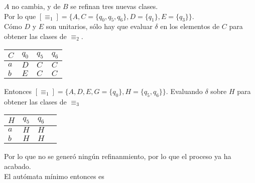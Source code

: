 \documentclass{article}
\begin{document}
\begin{enumerate}
{\begin{enumerate}
                $A$ no cambia, y de $B$ se refinan tres nuevas clases.\\
                Por lo que $[\equiv_{1}] = \{A, C = \{q_{0}, q_{5}, q_{6}\},
                D = \{q_{1}\}, E = \{q_{3}\}\}$.\\
                Cómo $D$ y $E$ son unitarios, sólo hay que evaluar $\delta$ en 
                los elementos de $C$ para obtener las clases de $\equiv_{2}$.\\
                \begin{table}[H]
                    \centering
                    \begin{tabular}{|l|l|l|l|}
                    \hline
                    $C$ & $q_{0}$ & $q_{5}$ & $q_{6}$ \\ \hline
                    $a$ & $D$     & $C$     & $C$     \\ \hline
                    $b$ & $E$     & $C$     & $C$     \\ \hline
                    \end{tabular}
                \end{table} 
                Entonces $[\equiv_{1}] = \{A, D, E, G = \{q_{0}\}, H = \{q_{5},
                q_{6}\}\}$.
                Evaluando $\delta$ sobre $H$ para obtener las clases de 
                $\equiv_{3}$
                \begin{table}[H]
                    \centering
                    \begin{tabular}{|l|l|l|l|}
                    \hline
                    $H$ & $q_{5}$ & $q_{6}$ \\ \hline
                    $a$ & $H$     & $H$     \\ \hline
                    $b$ & $H$     & $H$     \\ \hline
                    \end{tabular}
                \end{table}
                Por lo que no se generó ningún refinanmiento, por lo que el 
                proceso ya ha acabado.\\
                El autómata mínimo entonces es 
            \end{enumerate}
    	}
    \end{enumerate}
\end{document}
